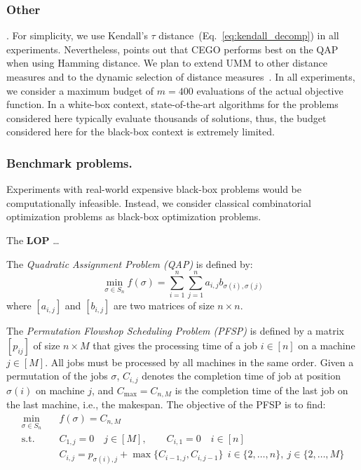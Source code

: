 \documentclass[runningheads]{llncs}
\newcommand{\FEmax}{\ensuremath{m}}
\begin{document}
\subsubsection{Other}.  For simplicity, we use Kendall's $\tau$
distance~(Eq.~\ref{eq:kendall_decomp}) in all
experiments. Nevertheless,
\citet{ZaeStoFriFisNauBar2014} points out that CEGO performs best on the QAP
when using Hamming distance.  We plan to extend UMM to other distance measures
and to the dynamic selection of distance measures~\citep{ZaeStoBar2014:ppsn}.
In all experiments, we consider a maximum budget of $\FEmax=400$ evaluations of
the actual objective function. In a white-box context, state-of-the-art
algorithms for the problems considered here typically evaluate
thousands of solutions, thus, the budget considered
here for the black-box context is extremely limited.


\subsubsection{Benchmark problems.} Experiments with real-world expensive black-box problems would be computationally infeasible. Instead, we consider classical combinatorial optimization problems as black-box optimization problems.

The \textbf{LOP} \ldots

The \emph{Quadratic Assignment Problem (QAP)} is defined by:
\begin{equation}\label{eq:qap}
  \min_{\sigma \in S_n} f(\sigma) = \sum_{i=1}^n \sum_{j=1}^n a_{i,j} b_{\sigma(i), \sigma(j)}
\end{equation}
%
where $[a_{i,j}]$ and $[b_{i,j}]$ are two matrices of size $n \times n$.

The \emph{Permutation Flowshop Scheduling Problem (PFSP)} is defined by a matrix $[p_{ij}]$ of size $n \times M$ that gives the processing time of a job $i \in [n]$ on a machine $j \in [M]$. All jobs must be processed by all machines in the same order. Given a permutation of the jobs $\sigma$, $C_{i,j}$ denotes the completion time of job at position $\sigma(i)$ on machine $j$, and $C_{\max} = C_{n,M}$  is the completion time of the last job on the last machine, i.e., the makespan. The objective of the PFSP is to find:
\begin{equation}\label{eq:qap}
  \begin{split}
    \min_{\sigma \in S_n}\quad& f(\sigma) = C_{n,M}\\
    \text{s.t.}\quad & C_{1,j} = 0 \quad j\in [M], \qquad C_{i,1} = 0\quad i \in [n]\\
    &C_{i,j} = p_{\sigma(i),j} + \max\{C_{i-1, j}, C_{i, j-1}\}  \ \  i \in \{2,\dotsc,n\},\ j \in\{2,\dotsc, M\}\\
\end{split}
\end{equation}
\end{document}
